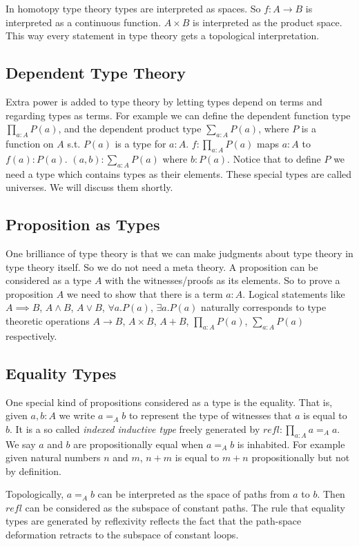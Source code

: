 \documentclass[10pt]{article}
\theoremstyle{definition}
\theoremstyle{plain}
\theoremstyle{remark}
\begin{document}
In homotopy type theory types are interpreted as spaces. So $f : A \to B$ is 
interpreted as a continuous function. $A \times B$ is interpreted as the product space.
This way every statement in type theory gets a topological interpretation.

\subsection{Dependent Type Theory}
Extra power is added to type theory by letting types depend on terms and regarding types as
terms. For example we can define the dependent function type $\prod_{a : A} P(a)$, and the 
dependent product type $\sum_{a : A} P(a)$, where $P$ is a function on $A$ s.t. $P(a)$ is a 
type for $a : A$. $f : \prod_{a : A} P(a)$ maps $a : A$ to 
$f(a) : P(a)$. $(a,b) : \sum_{a : A} P(a)$ where $b : P(a)$. Notice that to define 
$P$ we need a type which contains types as their elements.
These special types are called universes. We will discuss them shortly. 
 
\subsection{Proposition as Types}
One brilliance of type theory is that we can make judgments about type theory in type theory
itself. So we do not need a meta theory. A proposition can be considered as a type $A$ with 
the witnesses/proofs as its elements. So to prove a proposition $A$ we need to show that 
there is a term $a : A$. Logical statements like $A \implies B$, $A \wedge B$, $A \vee B$, 
$\forall a. P(a)$, $\exists a. P(a)$ naturally corresponds to type theoretic operations 
$A \to B$, $A \times B$, $A + B$, $\prod_{a : A} P(a)$, $\sum_{a : A} P(a)$
respectively.\smallskip

\subsection{Equality Types}
One special kind of propositions considered as a type is the equality. That is, 
given $a,b : A$ we write $a =_A b$ to represent the type of witnesses that $a$ is equal to $b$. 
It is a so called \emph{indexed inductive type} freely generated by 
${refl} :\prod_{a : A} a =_A a$. We say $a$ and $b$ are propositionally equal 
when $a =_A b$ is inhabited. For example given natural numbers $n$ and $m$, 
$n+m$ is equal to $m+n$ propositionally but not by definition.
\smallskip

Topologically, $a =_A b$ can be interpreted as the space of paths from $a$ to $b$. Then 
${refl}$ can be considered as the subspace of constant paths. The rule that equality
types are generated by reflexivity reflects the fact that the path-space deformation retracts
to the subspace of constant loops.
\end{document}
